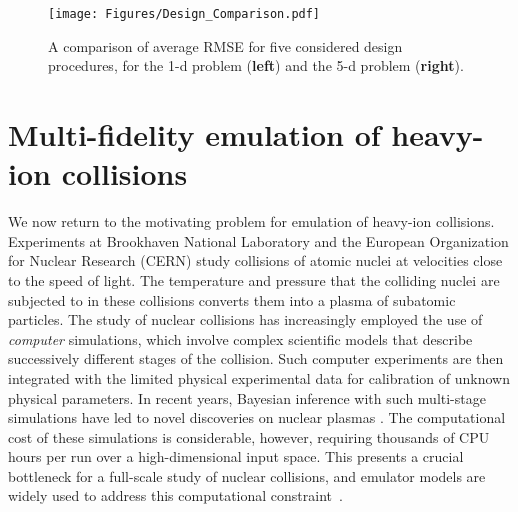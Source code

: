 \documentclass[12pt]{article}
\begin{document}
\begin{figure}[!t]
    \centering
    \texttt{[image: Figures/Design\_Comparison.pdf]}
    \vspace{-0.5cm}
  \caption{A comparison of average RMSE for five considered design procedures, for the 1-d problem (\textbf{left}) and the 5-d problem (\textbf{right}).}
  \label{fig:Example5dDesigns}
\end{figure}


\section{Multi-fidelity emulation of heavy-ion collisions} \label{sec:app}

We now return to the motivating problem for emulation of heavy-ion collisions. Experiments at Brookhaven National Laboratory and the European Organization for Nuclear Research (CERN) study collisions of atomic nuclei at velocities close to the speed of light. The temperature and pressure that the colliding nuclei are subjected to in these collisions converts them into a plasma of subatomic particles. The study of nuclear collisions has increasingly employed the use of \textit{computer} simulations, which involve complex scientific models that describe successively different stages of the collision. Such computer experiments are then integrated with the limited physical experimental data for calibration of unknown physical parameters. In recent years, Bayesian inference with such multi-stage simulations have led to novel discoveries on nuclear plasmas \citep{Bernhard:2019bmu,everett2021phenomenological,everett2021multisystem}. The computational cost of these simulations is considerable, however, requiring thousands of CPU hours per run over a high-dimensional input space. This presents a crucial bottleneck for a full-scale study of nuclear collisions, and emulator models are widely used to address this computational constraint~\citep{Novak:2013bqa}.

\end{document}
